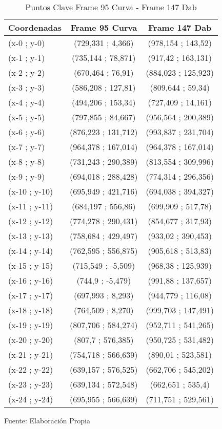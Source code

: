 \begin{table}[htbp]
	\centering
	\begin{tabular}{|l|c|c|}
		\hline
		Coordenadas &Frame 95 Curva &Frame 147 Dab	\\ \hline 
		(x-0 ; y-0) & (729,331 ; 4,366) & (978,154 ; 143,52) \\
		(x-1 ; y-1) & (735,144 ; 78,871) & (917,42 ; 163,131) \\
		(x-2 ; y-2) & (670,464 ; 76,91) & (884,023 ; 125,923) \\
		(x-3 ; y-3) & (586,208 ; 127,81) & (809,644 ; 59,34) \\
		(x-4 ; y-4) & (494,206 ; 153,34) & (727,409 ; 14,161) \\
		(x-5 ; y-5) & (797,855 ; 84,667) & (956,564 ; 200,389) \\
		(x-6 ; y-6) & (876,223 ; 131,712) & (993,837 ; 231,704) \\
		(x-7 ; y-7) & (964,378 ; 167,014) & (964,378 ; 167,014) \\
		(x-8 ; y-8) & (731,243 ; 290,389) & (813,554 ; 309,996) \\
		(x-9 ; y-9) & (694,018 ; 288,428) & (774,314 ; 296,356) \\
		(x-10 ; y-10) & (695,949 ; 421,716) & (694,038 ; 394,327) \\
		(x-11 ; y-11) & (684,197 ; 556,86) & (699,909 ; 517,78) \\
		(x-12 ; y-12) & (774,278 ; 290,431) & (854,677 ; 317,93) \\
		(x-13 ; y-13) & (758,684 ; 429,497) & (933,02 ; 390,453) \\
		(x-14 ; y-14) & (762,595 ; 556,875) & (905,618 ; 513,83) \\
		(x-15 ; y-15) & (715,549 ; -5,509) & (968,38 ; 125,939) \\
		(x-16 ; y-16) & (744,9 ; -5,479) & (991,88 ; 137,657) \\
		(x-17 ; y-17) & (697,993 ; 8,293) & (944,779 ; 116,08) \\
		(x-18 ; y-18) & (764,509 ; 8,270) & (999,703 ; 147,491) \\
		(x-19 ; y-19) & (807,706 ; 584,274) & (952,711 ; 541,265) \\
		(x-20 ; y-20) & (807,7 ; 576,385) & (950,725 ; 531,482) \\
		(x-21 ; y-21) & (754,718 ; 566,639) & (890,01 ; 523,581) \\
		(x-22 ; y-22) & (639,157 ; 576,525) & (662,706 ; 545,202) \\
		(x-23 ; y-23) & (639,134 ; 572,548) & (662,651 ; 535,4) \\
		(x-24 ; y-24) & (695,955 ; 566,639) & (711,751 ; 529,561) \\ \hline 
	\end{tabular}%
	\caption{Puntos Clave Frame 95 Curva - Frame 147 Dab}
	\footnotesize Fuente: Elaboración Propia
	\label{checkeroriginalpart2}
\end{table}%



